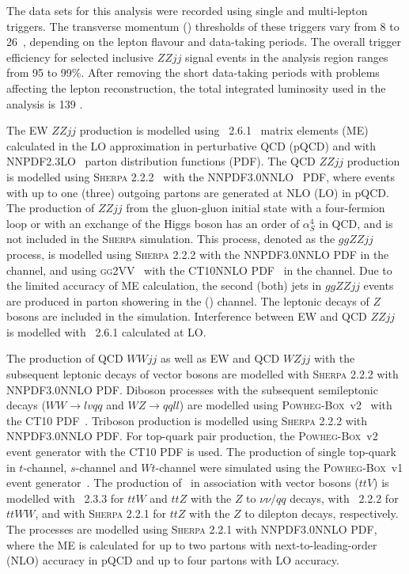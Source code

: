 The data sets for this analysis were recorded using single and multi-lepton triggers.
The transverse momentum (\pT) thresholds of these triggers vary from 8 to 26~\GeV{},
depending on the lepton flavour and data-taking periods.
The overall trigger efficiency for selected inclusive $ZZjj$ signal events in the analysis region ranges from 95 to 99\%{}.
After removing the short data-taking periods with problems affecting the lepton reconstruction,
the total integrated luminosity used in the analysis is 139 \ifb.

The EW $ZZjj$ production is modelled using \MGMCatNLO~2.6.1~\cite{Alwall:2014hca} matrix elements (ME) calculated in the LO approximation
in perturbative QCD (pQCD) and with NNPDF2.3LO~\cite{Ball:2012cx} parton distribution functions (PDF).
The QCD $ZZjj$ production is modelled using \textsc{Sherpa} 2.2.2~\cite{Gleisberg:2008ta} with the NNPDF3.0NNLO~\cite{ball2015parton} PDF,
where events with up to one (three) outgoing partons are generated at NLO (LO) in pQCD.
The production of $ZZjj$ from the gluon-gluon initial state with a four-fermion loop or with an exchange of the Higgs boson has an order of $\alpha_{S}^{4}$ in QCD,
and is not included in the \textsc{Sherpa} simulation.
This process, denoted as the $ggZZjj$ process, is modelled using \textsc{Sherpa} 2.2.2 with the NNPDF3.0NNLO PDF in the \lllljj channel,
and using \textsc{gg2VV}~\cite{Kauer:2013qba} with the CT10NNLO PDF~\cite{Gao:2013xoa} in the \llvvjj channel.
Due to the limited accuracy of ME calculation, the second (both) jets in $ggZZjj$ events are produced in parton showering in the \lllljj (\llvvjj) channel.
The leptonic decays of $Z$ bosons are included in the simulation.
Interference between EW and QCD $ZZjj$ is modelled with \MGMCatNLO~2.6.1 calculated at LO. 

The production of QCD $WWjj$ as well as EW and QCD $WZjj$ with the subsequent leptonic decays of vector bosons are modelled with \textsc{Sherpa} 2.2.2 with NNPDF3.0NNLO PDF.
Diboson processes with the subsequent semileptonic decays ($WW \rightarrow lvqq$ and $WZ \rightarrow qqll$)
are modelled using \textsc{Powheg-Box}~v2~\cite{Frixione:2007nw} with the CT10 PDF~\cite{Lai:2010vv}.
Triboson production is modelled using \textsc{Sherpa} 2.2.2 with NNPDF3.0NNLO PDF.
For top-quark pair production, the \textsc{Powheg-Box}~v2 event generator with the CT10 PDF is used.
The production of single top-quark in $t$-channel, $s$-channel and $Wt$-channel were simulated using the \textsc{Powheg-Box}~v1 event generator~\cite{Alioli:2009je,Frederix:2012dh,Re:2010bp}.
The production of \ttbar~in association with vector bosons ($ttV$) is modelled with \MGMCatNLO~2.3.3 for $ttW$ and $ttZ$ with the $Z$ to $\nu\nu/qq$ decays,
with \MGMCatNLO~2.2.2 for $ttWW$, and with \textsc{Sherpa} 2.2.1 for $ttZ$ with the $Z$ to dilepton decays, respectively.
The \Zjet processes are modelled using \textsc{Sherpa} 2.2.1 with NNPDF3.0NNLO PDF, where the ME is calculated for up to two partons with next-to-leading-order (NLO) accuracy in pQCD and up to four partons with LO accuracy.

